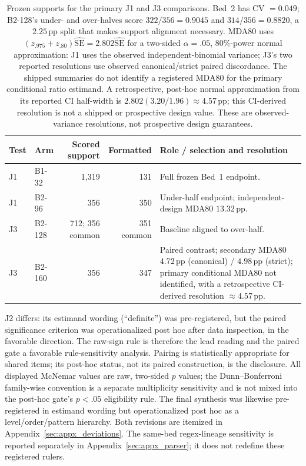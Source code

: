 \documentclass{article}
\newcommand{\pp}{\,\mathrm{pp}}
\begin{document}
\begin{table}[!htbp]
\centering\footnotesize
\setlength{\tabcolsep}{3pt}
\begin{tabular}{@{}llrr>{\raggedright\arraybackslash}p{5.45cm}@{}}
\toprule
Test & Arm & Scored support & Formatted & Role / selection and resolution \\
\midrule
J1 & \textsc{B1-32} & 1,319 & 131 & Full frozen Bed~1 endpoint. \\
J1 & \textsc{B2-96} & 356 & 350 & Under-half endpoint; independent-design MDA80 $13.32\pp$. \\
J3 & \textsc{B2-128} & 712; 356 common & 351 common & Baseline aligned to over-half. \\
J3 & \textsc{B2-160} & 356 & 347 & Paired contrast; secondary MDA80 $4.72\pp$ (canonical) / $4.98\pp$ (strict); primary conditional MDA80 not identified, with a retrospective CI-derived resolution $\approx4.57\pp$. \\
\bottomrule
\end{tabular}
\caption{Frozen supports for the primary J1 and J3 comparisons.  Bed~2 has
CV $=0.049$; B2-128's under- and over-halves score $322/356=0.9045$ and
$314/356=0.8820$, a $2.25\pp$ split that makes support alignment necessary.
MDA80 uses $(z_{.975}+z_{.80})\widehat{\mathrm{SE}}=2.802\widehat{\mathrm{SE}}$
for a two-sided $\alpha=.05$, 80\%-power normal approximation: J1 uses the
observed independent-binomial variance; J3's two reported resolutions use
observed canonical/strict paired discordance.  The shipped summaries do not
identify a registered MDA80 for the primary conditional ratio estimand.  A
retrospective, post-hoc normal approximation from its reported CI half-width
is $2.802(3.20/1.96)\approx4.57\pp$; this CI-derived resolution is not a shipped
or prospective design value.  These are
observed-variance resolutions, not prospective design guarantees.}
\label{tab:supports}
\end{table}

J2 differs: its estimand wording (``definite'') was pre-registered, but the
paired significance criterion was operationalized post hoc after data
inspection, in the favorable direction.  The raw-sign rule is therefore the
lead reading and the paired gate a favorable rule-sensitivity analysis.  Pairing is statistically
appropriate for shared items; its post-hoc status, not its paired construction,
is the disclosure.  All displayed McNemar values are raw, two-sided $p$ values;
the Dunn--Bonferroni family-wise convention is a separate multiplicity
sensitivity and is not mixed into the post-hoc gate's $p<.05$ eligibility
rule.  The final synthesis was likewise pre-registered in
estimand wording but operationalized post hoc as a level/order/pattern
hierarchy.  Both revisions are itemized in
Appendix~\ref{sec:appx_deviations}.
The same-bed regex-lineage sensitivity is reported separately in
Appendix~\ref{sec:appx_parser}; it does not redefine these registered rulers.
\end{document}
